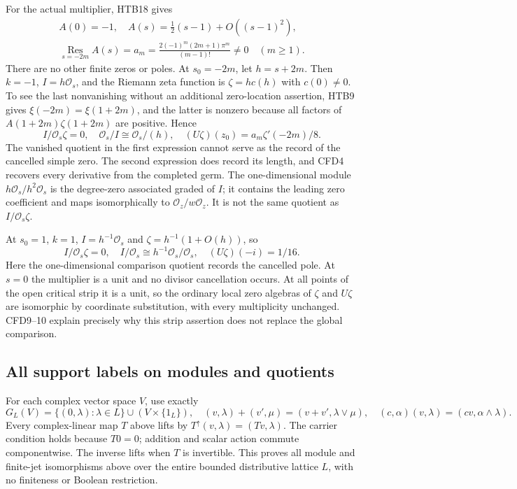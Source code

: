 \documentclass[11pt]{article}
\theoremstyle{definition}
\begin{document}
For the actual multiplier, HTB18 gives
\begin{equation}\tag{CFD8}
\begin{gathered}
 A(0)=-1,\quad A(s)=\tfrac12(s-1)+O((s-1)^2),\\
 \operatorname*{Res}_{s=-2m}A(s)
    =a_m=\frac{2(-1)^m(2m+1)\pi^m}{(m-1)!}\ne0
       \quad(m\ge1).
\end{gathered}
\end{equation}
There are no other finite zeros or poles. At $s_0=-2m$, let
$h=s+2m$. Then $k=-1$, $I=h\mathcal O_s$, and the Riemann zeta
function is $\zeta=h c(h)$ with $c(0)\ne0$. To see the last
nonvanishing without an additional zero-location assertion, HTB9
gives $\xi(-2m)=\xi(1+2m)$, and the latter is nonzero because all
factors of $A(1+2m)\zeta(1+2m)$ are positive. Hence
\begin{equation}\tag{CFD9}
 I/\mathcal O_s\zeta=0,\quad
 \mathcal O_s/I\cong\mathcal O_s/(h),\quad
 (U\zeta)(z_0)=a_m\zeta'(-2m)/8.
\end{equation}
The vanished quotient in the first expression cannot serve as the
record of the cancelled simple zero. The second expression does
record its length, and CFD4 recovers every derivative from the
completed germ. The one-dimensional module $h\mathcal O_s/h^2
\mathcal O_s$ is the degree-zero associated graded of $I$; it
contains the leading zero coefficient and maps isomorphically to
$\mathcal O_z/w\mathcal O_z$. It is not the same quotient as
$I/\mathcal O_s\zeta$.

At $s_0=1$, $k=1$, $I=h^{-1}\mathcal O_s$ and
$\zeta=h^{-1}(1+O(h))$, so
\begin{equation}\tag{CFD10}
 I/\mathcal O_s\zeta=0,\quad
 I/\mathcal O_s\cong h^{-1}\mathcal O_s/\mathcal O_s,
 \quad (U\zeta)(-i)=1/16.
\end{equation}
Here the one-dimensional comparison quotient records the cancelled
pole. At $s=0$ the multiplier is a unit and no divisor cancellation
occurs. At all points of the open critical strip it is a unit,
so the ordinary local zero algebras of $\zeta$ and $U\zeta$ are
isomorphic by coordinate substitution, with every multiplicity
unchanged. CFD9--10 explain precisely why this strip assertion
does not replace the global comparison.

\subsection{All support labels on modules and quotients}

For each complex vector space $V$, use exactly
\begin{equation}\tag{CFD11}
 G_L(V)=\{(0,\lambda):\lambda\in L\}\cup(V\times\{1_L\}),
 \quad (v,\lambda)+(v',\mu)=(v+v',\lambda\vee\mu),
 \quad(c,\alpha)(v,\lambda)=(cv,\alpha\wedge\lambda).
\end{equation}
Every complex-linear map $T$ above lifts by
$T^\uparrow(v,\lambda)=(Tv,\lambda)$. The carrier condition holds
because $T0=0$; addition and scalar action commute componentwise.
The inverse lifts when $T$ is invertible. This proves all module
and finite-jet isomorphisms above over the entire bounded
distributive lattice $L$, with no finiteness or Boolean restriction.
\end{document}
